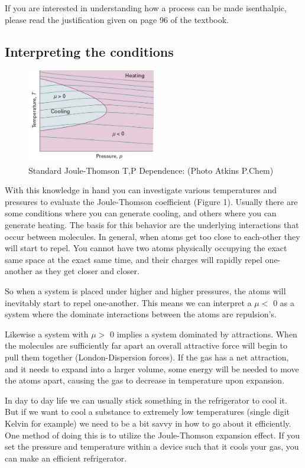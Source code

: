 \documentclass{article}
\begin{document}
If you are interested in understanding how a process can be made isenthalpic, please read the justification given on page 96 of the textbook. 

\subsection*{Interpreting the conditions}

\begin{figure}[h!]
\centering
\caption{Standard Joule-Thomson T,P Dependence: (Photo Atkins P.Chem)}
\includegraphics[width=0.5\textwidth]{JT.png}
\end{figure}

With this knowledge in hand you can investigate various temperatures and pressures to evaluate the Joule-Thomson coefficient (Figure 1).
Usually there are some conditions where you can generate cooling, and others where you can generate heating. 
The basis for this behavior are the underlying interactions that occur between molecules. 
In general, when atoms get too close to each-other they will start to repel.
You cannot have two atoms physically occupying the exact same space at the exact same time, and their charges will rapidly repel one-another as they get closer and closer. 

So when a system is placed under higher and higher pressures, the atoms will inevitably start to repel one-another. 
This means we can interpret a $\mu <$ 0 as a system where the dominate interactions between the atoms are repulsion's. 

Likewise a system with $\mu >$ 0 implies a system dominated by attractions. 
When the molecules are sufficiently far apart an overall attractive force will begin to pull them together (London-Dispersion forces). 
If the gas has a net attraction, and it needs to expand into a larger volume, some energy will be needed to move the atoms apart, causing the gas to decrease in temperature upon expansion. 

In day to day life we can usually stick something in the refrigerator to cool it. 
But if we want to cool a substance to extremely low temperatures (single digit Kelvin for example) we need to be a bit savvy in how to go about it efficiently. 
One method of doing this is to utilize the Joule-Thomson expansion effect. If you set the pressure and temperature within a device such that it cools your gas, you can make an efficient refrigerator. 
\end{document}
